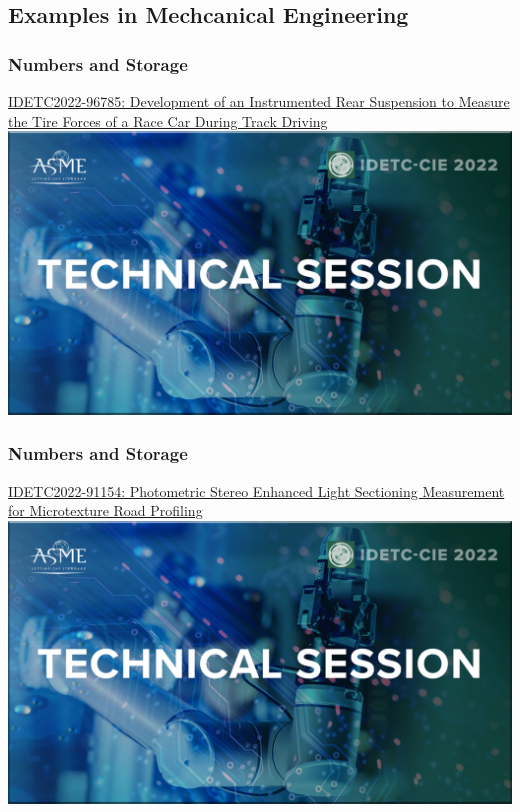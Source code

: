 \documentclass[fleqn]{beamer} %
\newcommand{\sectionIVtitle}{Numbers and Storage}
\newcommand{\sectionIsubsectionIVtitle}{Examples in Mechcanical Engineering}
\begin{document}
		\subsection{\sectionIsubsectionIVtitle}\label{sectionIsubsectionIV}	

			\begin{frame}[label=sectionIV]
				\frametitle{\sectionIVtitle}
				\href{https://events-platform.asmeconferences.org/event/idetc-cie-2022/planning/UGxhbm5pbmdfOTcxMjI2}{IDETC2022-96785: Development of an Instrumented Rear Suspension to Measure the Tire Forces of a Race Car During Track Driving}\vspace{5mm}\\

				\includegraphics[scale=0.125]{images/IDETC_technical_session.png}

			\end{frame}

			\begin{frame}[label=sectionIV]
				\frametitle{\sectionIVtitle}

				\href{https://events-platform.asmeconferences.org/event/idetc-cie-2022/planning/UGxhbm5pbmdfOTcxMzIx}{IDETC2022-91154: Photometric Stereo Enhanced Light Sectioning Measurement for Microtexture Road Profiling}\vspace{5mm}\\

				\includegraphics[scale=0.125]{images/IDETC_technical_session.png}
			 
			\end{frame}
\end{document}
